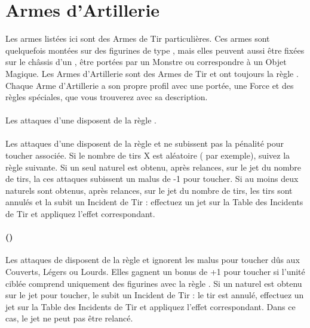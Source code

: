 \newpage
\hypertarget{artilleryweapons}{\section{Armes d'Artillerie}}
\label{artillery_weapons}

Les armes listées ici sont des Armes de Tir particulières. Ces armes sont quelquefois montées sur des figurines de type \warmachine{}, mais elles peuvent aussi être fixées sur le châssis d'un \chariot{}, être portées par un Monstre ou correspondre à un Objet Magique. Les Armes d'Artillerie sont des Armes de Tir et ont toujours la règle \og \reload{} \fg{}. Chaque Arme d'Artillerie a son propre profil avec une portée, une Force et des règles spéciales, que vous trouverez avec sa description.

\paragraph{\boltthrower}

Les attaques d'une \boltthrower{} disposent de la règle \penetrating{}.

\paragraph{}

Les attaques d'une \volleygun{} disposent de la règle  et ne subissent pas la pénalité pour toucher associée. Si le nombre de tirs X est aléatoire ( par exemple), suivez la règle suivante. Si un seul  naturel est obtenu, après relances, sur le jet du nombre de tirs, la ces attaques subissent un malus de -1 pour toucher. Si au moins deux  naturels sont obtenus, après relances, sur le jet du nombre de tirs, les tirs sont annulés et la \volleygun{} subit un Incident de Tir : effectuez un jet sur la Table des Incidents de Tir et appliquez l'effet correspondant.

\paragraph{\cannon{} ()}

Les attaques de \cannon{} disposent de la règle \penetrating{} et ignorent les malus pour toucher dûs aux Couverts, Légers ou Lourds. Elles gagnent un bonus de +1 pour toucher si l'unité ciblée comprend uniquement des figurines avec la règle \toweringpresence{}. Si un  naturel est obtenu sur le jet pour toucher, le \cannon{} subit un Incident de Tir : le tir est annulé, effectuez un jet sur la Table des Incidents de Tir et appliquez l'effet correspondant. Dans ce cas, le jet ne peut pas être relancé.

